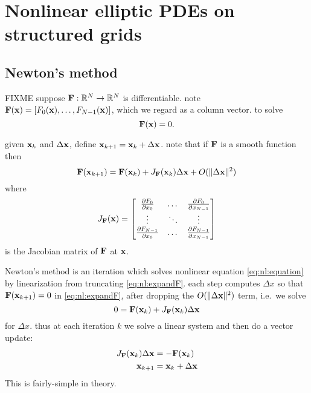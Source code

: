 \renewcommand{\CODELOC}{c/ch4/}

\chapter{Nonlinear elliptic PDEs on structured grids}
\label{chap:nonlinear}

\section{Newton's method}

FIXME suppose $\mathbf{F} : \mathbb{R}^N \to \mathbb{R}^N$ is differentiable.  note $\mathbf{F}(\mathbf{x}) = [F_0(\mathbf{x}), \dots, F_{N-1}(\mathbf{x})]$, which we regard as a column vector.  to solve
\begin{equation}
   \mathbf{F}(\mathbf{x}) = 0.   \label{eq:nl:equation}
\end{equation}

given $\mathbf{x}_k$ and $\Delta\mathbf{x}$, define $\mathbf{x}_{k+1} = \mathbf{x}_k + \Delta\mathbf{x}$.  note that if $\mathbf{F}$ is a smooth function then
\begin{equation}
    \mathbf{F}(\mathbf{x}_{k+1}) = \mathbf{F}(\mathbf{x}_k) + J_{\mathbf{F}}(\mathbf{x}_k) \Delta\mathbf{x} + O(\|\Delta\mathbf{x}\|^2)  \label{eq:nl:expandF}
\end{equation}
where
\begin{equation}
J_{\mathbf{F}}(\mathbf{x}) = \begin{bmatrix}
    \frac{\partial F_0}{\partial x_0} & \dots & \frac{\partial F_0}{\partial x_{N-1}} \\
    \vdots & \ddots & \vdots \\
    \frac{\partial F_{N-1}}{\partial x_0} & \dots & \frac{\partial F_{N-1}}{\partial x_{N-1}}  \end{bmatrix}  \label{eq:nl:jacdefn}
\end{equation}
is the Jacobian matrix of $\mathbf{F}$ at $\mathbf{x}$.

Newton's method is an iteration which solves nonlinear equation \eqref{eq:nl:equation} by linearization from truncating \eqref{eq:nl:expandF}.  each step computes $\Delta x$ so that $\mathbf{F}(\mathbf{x}_{k+1})=0$ in \eqref{eq:nl:expandF}, after dropping the $O(\|\Delta\mathbf{x}\|^2)$ term, i.e.~we solve
\begin{equation}
    0 = \mathbf{F}(\mathbf{x}_k) + J_{\mathbf{F}}(\mathbf{x}_k) \Delta\mathbf{x}
\end{equation}
for $\Delta x$.  thus at each iteration $k$ we solve a linear system and then do a vector update:
\begin{align}
    J_{\mathbf{F}}(\mathbf{x}_k) \Delta\mathbf{x} &= - \mathbf{F}(\mathbf{x}_k)  \label{eq:nl:Newton}  \\
    \mathbf{x}_{k+1} &= \mathbf{x}_k + \Delta\mathbf{x}  \notag
\end{align}
This is fairly-simple in theory.

